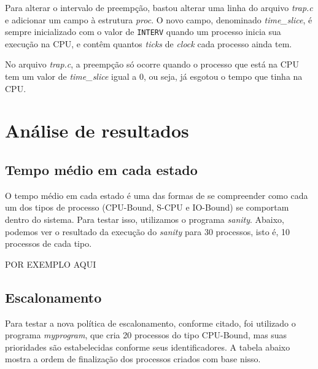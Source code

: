 \documentclass{article}
\begin{document}
Para alterar o intervalo de preempção, bastou alterar uma linha do arquivo
\textit{trap.c} e adicionar um campo à estrutura \textit{proc}. O novo campo,
denominado \textit{time\_slice}, é sempre inicializado com o valor de
\texttt{INTERV} quando um processo inicia sua execução na CPU, e contêm quantos
\textit{ticks} de \textit{clock} cada processo ainda tem.

No arquivo \textit{trap.c}, a preempção só ocorre quando o processo que está na
CPU tem um valor de \textit{time\_slice} igual a 0, ou seja, já esgotou o tempo
que tinha na CPU.

\section{Análise de resultados}

\subsection{Tempo médio em cada estado}

O tempo médio em cada estado é uma das formas de se compreender como cada um
dos tipos de processo (CPU-Bound, S-CPU e IO-Bound) se comportam dentro do
sistema. Para testar isso, utilizamos o programa \textit{sanity}. Abaixo,
podemos ver o resultado da execução do \textit{sanity} para 30 processos, isto
é, 10 processos de cada tipo.

POR EXEMPLO AQUI

\subsection{Escalonamento}

Para testar a nova política de escalonamento, conforme citado, foi utilizado o
programa \textit{myprogram}, que cria 20 processos do tipo
CPU-Bound, mas suas prioridades são estabelecidas conforme seus
identificadores. A tabela abaixo mostra a ordem de finalização dos processos
criados com base nisso.
\end{document}
